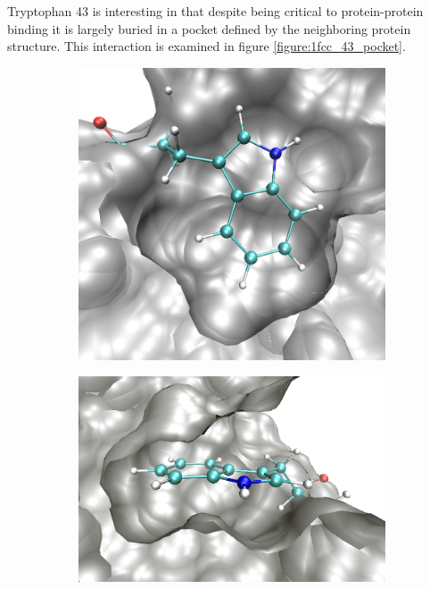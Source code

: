 Tryptophan 43 is interesting in that despite being critical to protein-protein binding it is largely buried in a pocket defined by the neighboring protein structure.
This interaction is examined in figure \protect\ref{figure:1fcc_43_pocket}.
\begin{figure}[h]
    \centering
    \begin{subfigure}[b]{0.3\textwidth}
        \centering
        \includegraphics[width=\textwidth,height=\textheight,keepaspectratio]{figures/mutation_side_chain_images/in_pocket_out_of_plane.png}
        \caption{}
        \label{figure:mutation_side_chain_images/in_pocket_out_of_plane}
    \end{subfigure}
    \hspace{0.1\textwidth}
    \begin{subfigure}[b]{0.3\textwidth}
        \centering
        \includegraphics[width=\textwidth,height=\textheight,keepaspectratio]{figures/mutation_side_chain_images/in_pocket_in_plane.png}

\end{subfigure}
\end{figure}
